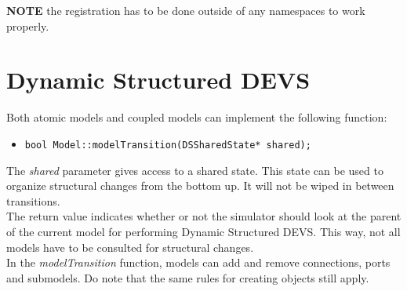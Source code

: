 \textbf{NOTE} the registration has to be done outside of any namespaces to work properly.

\section{Dynamic Structured DEVS}
Both atomic models and coupled models can implement the following function:
\begin{itemize}
	\item \texttt{bool Model::modelTransition(DSSharedState* shared);}
\end{itemize}
The \textsl{shared} parameter gives access to a shared state. This state can be used to organize structural changes from the bottom up. It will not be wiped in between transitions.\\
The return value indicates whether or not the simulator should look at the parent of the current model for performing Dynamic Structured DEVS. This way, not all models have to be consulted for structural changes.\\
In the \textsl{modelTransition} function, models can add and remove connections, ports and submodels. Do note that the same rules for creating objects still apply.
